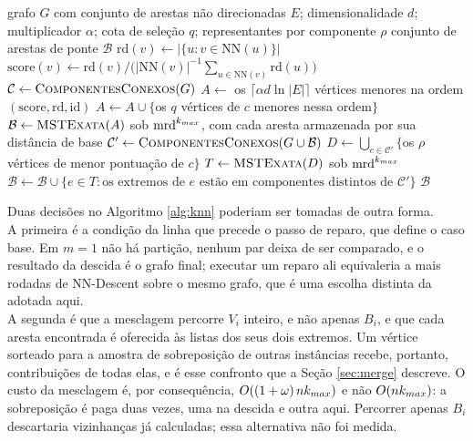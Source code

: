 \begin{algorithm}[htb!]
\caption{\label{alg:bridges} A metade de árvore geradora, estimada por anti-hubs}
\begin{algorithmic}[1]
\REQUIRE grafo $G$ com conjunto de arestas não direcionadas $E$; dimensionalidade $d$; multiplicador $\alpha$; cota de seleção $q$; representantes por componente $\rho$
\ENSURE conjunto de arestas de ponte $\mathcal{B}$
    \STATE $\mathrm{rd}(v) \leftarrow |\{u : v \in \mathrm{NN}(u)\}|$
\ENDFOR
{}
    \STATE $\mathrm{score}(v) \leftarrow \mathrm{rd}(v) \big/ \big( |\mathrm{NN}(v)|^{-1}\textstyle\sum_{u \in \mathrm{NN}(v)} \mathrm{rd}(u) \big)$
\ENDFOR
\STATE $\mathcal{C} \leftarrow \textsc{ComponentesConexos}(G)$
\STATE $A \leftarrow$ os $\lceil \alpha d \ln|E| \rceil$ vértices menores na ordem $(\mathrm{score}, \mathrm{rd}, \mathrm{id})$
    \STATE $A \leftarrow A \cup \{$os $q$ vértices de $c$ menores nessa ordem$\}$
\ENDFOR
\STATE $\mathcal{B} \leftarrow \textsc{MSTExata}(A)$ sob $\mathrm{mrd}^{k_{max}}$, com cada aresta armazenada por sua distância de base
\STATE $\mathcal{C}' \leftarrow \textsc{ComponentesConexos}(G \cup \mathcal{B})$
    \STATE $D \leftarrow \bigcup_{c \in \mathcal{C}'} \{$os $\rho$ vértices de menor pontuação de $c\}$
    \STATE $T \leftarrow \textsc{MSTExata}(D)$ sob $\mathrm{mrd}^{k_{max}}$
    \STATE $\mathcal{B} \leftarrow \mathcal{B} \cup \{e \in T : \text{os extremos de } e \text{ estão em componentes distintos de } \mathcal{C}'\}$
\ENDIF
\RETURN $\mathcal{B}$
\end{algorithmic}
\end{algorithm}

Duas decisões no Algoritmo \ref{alg:knn} poderiam ser tomadas de outra forma.\\

A primeira é a condição da linha que precede o passo de reparo, que define o caso base. Em $m = 1$ não há partição, nenhum par deixa de ser comparado, e o resultado da descida é o grafo final; executar um reparo ali equivaleria a mais rodadas de NN-Descent sobre o mesmo grafo, que é uma escolha distinta da adotada aqui.\\

A segunda é que a mesclagem percorre $V_i$ inteiro, e não apenas $B_i$, e que cada aresta encontrada é oferecida às listas dos seus dois extremos. Um vértice sorteado para a amostra de sobreposição de outras instâncias recebe, portanto, contribuições de todas elas, e é esse confronto que a Seção \ref{sec:merge} descreve. O custo da mesclagem é, por consequência, $O((1+\omega)\,nk_{max})$ e não $O(nk_{max})$: a sobreposição é paga duas vezes, uma na descida e outra aqui. Percorrer apenas $B_i$ descartaria vizinhanças já calculadas; essa alternativa não foi medida.\\

